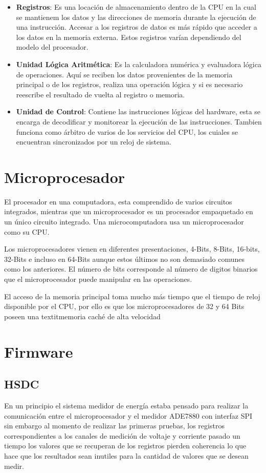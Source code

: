 \documentclass[letterpaper,12pt,oneside]{book}
\begin{document}
				\begin{itemize}
					\item \textbf{Registros}: Es una locación de almacenamiento dentro de la CPU en la cual se mantienem los datos y las direcciones de memoria durante la ejecución de una instrucción. Accesar a los registros de datos es más rápido que acceder a los datos en la memoria externa. Estos registros varían dependiendo del modelo del procesador.

					\item \textbf{Unidad Lógica Aritmética}: Es la calculadora numérica y evaluadora lógica de operaciones. Aquí se reciben los datos provenientes de la memoria principal o de los registros, realiza una operación lógica y si es necesario reescribe el resultado de vuelta al registro o memoria.

					\item \textbf{Unidad de Control}: Contiene las instrucciones lógicas del hardware, esta se encarga de decodificar y monitorear la ejecución de las instrucciones. Tambien funciona como árbitro de varios de los servicios del CPU, los cuiales se encuentran sincronizados por un reloj de sistema.
				\end{itemize}
	
	\section{Microprocesador}
		El procesador en una computadora, esta comprendido de varios circuitos integrados, mientras que un microprocesador es un procesador empaquetado en un único circuito integrado. Una microcomputadora usa un microprocesador como su CPU.

		Los microprocesadores vienen en diferentes presentaciones, 4-Bits, 8-Bits, 16-bits, 32-Bits e incluso en 64-Bits aunque estos últimos no son demasiado comunes como los anteriores. El número de bits corresponde al número de digitos binarios que el microprocesador puede manipular en las operaciones.

		El acceso de la memoria principal toma mucho más tiempo que el tiempo de reloj disponible por el CPU, por ello es que los microprocesadores de 32 y 64 Bits poseen una textit{memoria caché} de alta velocidad

	\section{Firmware}
		\subsection{HSDC}
			En un principio el sistema medidor de energía estaba pensado para realizar la comunicación entre el microprocesador y el medidor ADE7880 con interfaz SPI sin embargo al momento de realizar las primeras pruebas, los registros correspondientes a los canales de medición de voltaje y corriente pasado un tiempo los valores que se recuperan de los registros pierden coherencia lo que hace que los resultados sean inutiles para la cantidad de valores que se desean medir.
\end{document}
